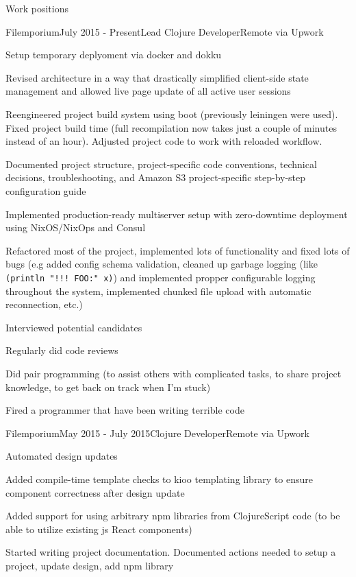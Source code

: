 \documentclass{resume} %
\begin{document}

\begin{rSection}{Work positions}

\begin{rSubsection}{Filemporium}{July 2015 - Present}{Lead Clojure Developer}{Remote via Upwork}
\item Setup temporary deplyoment via docker and dokku
\item Revised architecture in a way that drastically simplified client-side
  state management and allowed live page update of all active user sessions
\item Reengineered project build system using boot (previously leiningen were used).
  Fixed project build time (full recompilation now takes just a couple of minutes
  instead of an hour). Adjusted project code to work with reloaded workflow.
\item Documented project structure, project-specific code conventions, technical decisions, troubleshooting, and Amazon S3 project-specific step-by-step configuration guide
\item Implemented production-ready multiserver setup with zero-downtime deployment using NixOS/NixOps and Consul
\item Refactored most of the project, implemented lots of functionality and fixed lots of bugs (e.g added
  config schema validation, cleaned up garbage logging (like {\tt (println "!!! FOO:" x)}) and implemented
  propper configurable logging throughout the system, implemented chunked file upload with automatic reconnection, etc.)
\item Interviewed potential candidates
\item Regularly did code reviews
\item Did pair programming (to assist others with complicated tasks, to share project knowledge, to get
  back on track when I'm stuck)
\item Fired a programmer that have been writing terrible code
\end{rSubsection}

\begin{rSubsection}{Filemporium}{May 2015 - July 2015}{Clojure Developer}{Remote via Upwork}
\item Automated design updates
\item Added compile-time template checks to kioo templating library to ensure
  component correctness after design update
\item Added support for using arbitrary npm libraries from ClojureScript code (to be
  able to utilize existing js React components)
\item Started writing project documentation. Documented actions needed to setup
  a project, update design, add npm library


\end{rSubsection}
\end{rSection}
\end{document}
